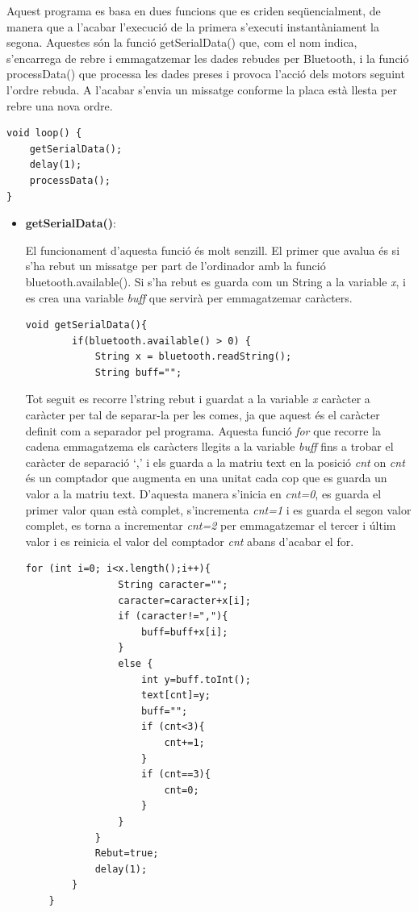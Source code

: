Aquest programa es basa en dues funcions que es criden seqüencialment, de manera que a l'acabar l’execució de la primera s’executi instantàniament la segona. Aquestes són la funció getSerialData() que, com el nom indica, s’encarrega de rebre i emmagatzemar les dades rebudes per Bluetooth, i la funció processData() que processa les dades preses i provoca l’acció dels motors seguint l’ordre rebuda. A l'acabar s’envia un missatge conforme la placa està llesta per rebre una nova ordre. 
\begin{lstlisting}[style=Arduino]
void loop() {
	getSerialData();
	delay(1);
	processData();
}
\end{lstlisting}
\begin{itemize}
	\item \textbf{getSerialData()}:
	
	El funcionament d’aquesta funció és molt senzill. El primer que avalua és si s’ha rebut un missatge per part de l’ordinador amb la funció bluetooth.available(). Si s’ha rebut es guarda com un String a la variable \emph{x}, i es crea una variable \emph{buff} que servirà per emmagatzemar caràcters. 
	
	\begin{lstlisting}[style=Arduino]
	void getSerialData(){
		if(bluetooth.available() > 0) {
			String x = bluetooth.readString();
			String buff="";
	\end{lstlisting}
	
	Tot seguit es recorre l’string rebut i guardat a la variable \emph{x} caràcter a caràcter per tal de separar-la per les comes, ja que aquest és el caràcter definit com a separador pel programa. Aquesta funció \emph{for} que recorre la cadena emmagatzema els caràcters llegits a la variable \emph{buff} fins a trobar el caràcter de separació ‘,’ i els guarda a la matriu text en la posició \emph{cnt} on \emph{cnt} és un comptador que augmenta en una unitat cada cop que es guarda un valor a la matriu text. D’aquesta manera s’inicia en \emph{cnt=0}, es guarda el primer valor quan està complet, s’incrementa \emph{cnt=1} i es guarda el segon valor complet, es torna a incrementar \emph{cnt=2} per emmagatzemar el tercer i últim valor i es reinicia el valor del comptador \emph{cnt} abans d’acabar el for. 
	
	\begin{lstlisting}[style=Arduino]
			for (int i=0; i<x.length();i++){
				String caracter="";
				caracter=caracter+x[i];
				if (caracter!=","){
					buff=buff+x[i];
				}
				else {
					int y=buff.toInt();
					text[cnt]=y;
					buff="";
					if (cnt<3){
						cnt+=1;
					}
					if (cnt==3){
						cnt=0;
					}
				}
			}
			Rebut=true;
			delay(1);    
		}
	}
	\end{lstlisting}
	

\end{itemize}
